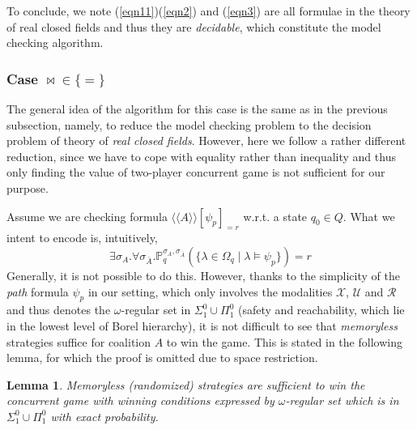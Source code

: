 \documentclass[times, 10 pt,twocolumn]{article}
\newenvironment{proof}[1][Proof]{\noindent\rm\textit{#1: }}{{\hspace*{\fill}$\square$}\ \newline}
\newtheorem{lemma}[theorem]{Lemma}{\bfseries}{\itshape}
\newcommand{\mb}[1]{\mathbb{#1}}
\newcommand{\mc}[1]{\mathcal{#1}}
\newcommand{\lla}{\langle\langle}
\newcommand{\rra}{\rangle\rangle}
\begin{document}
To conclude, we note (\ref{eqn11})(\ref{eqn2}) and (\ref{eqn3})
are all formulae in the theory of real closed fields and thus they
are \emph{decidable}, which constitute the model checking
algorithm.

\subsubsection{Case $\bowtie\in \{=\}$} \label{equalsection}

The general idea of the algorithm for this case is the same as in
the previous subsection, namely, to reduce the model checking
problem to the decision problem of theory of \emph{real closed
fields}. However, here we follow a rather different reduction,
since we have to cope with equality rather than inequality and
thus only finding the value of two-player concurrent game is not
sufficient for our purpose.

Assume we are checking formula $\lla A\rra [\psi_p]_{= r}$ w.r.t.
a state $q_0\in Q$. What we intent to encode is, intuitively,
\begin{equation} \label{eqn1}
\exists \sigma_A. \forall \sigma_{\bar{A}}.
\mb{P}^{\sigma_A,\sigma_{\bar{A}}}_q (\{\lambda\in
\Omega_q\mid\lambda \models \psi_p\}) = r
\end{equation}
%
Generally, it is not possible to do this. However, thanks to the
simplicity of the \emph{path} formula $\psi_p$ in our setting,
which only involves the modalities $\mc{X}$, $\mc{U}$ and $\mc{R}$
and thus denotes the $\omega$-regular set in $\Sigma_1^0 \cup
\Pi_1^0$ (safety and reachability, which lie in the lowest level
of Borel hierarchy), it is not difficult to see that
\emph{memoryless} strategies suffice for coalition $A$ to win the
game. This is stated in the following lemma, for which the proof
is omitted due to space restriction.
\begin{lemma}\label{memory}
  Memoryless (randomized) strategies are sufficient to win the
  concurrent game with winning conditions expressed by $\omega$-regular set
  which is in $\Sigma_1^0 \cup \Pi_1^0$ with exact probability.
\end{lemma}
%

\end{document}
